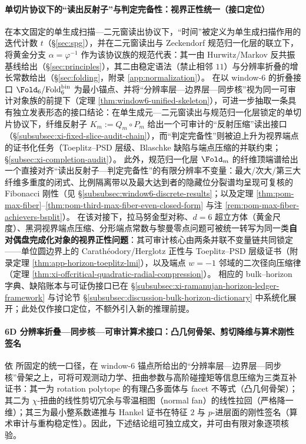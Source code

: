 \paragraph{单切片协议下的“读出反射子”与判定完备性：视界正性统一（接口定位）}
在本文固定的单生成扫描—二元窗读出协议下，“时间”被定义为单生成扫描作用的迭代计数 \(t\)（\S\ref{sec:spg}），并在二元窗读出与 Zeckendorf 规范归一化层的联立下，将黄金分支 \(\alpha=\varphi^{-1}\) 作为该协议族的规范代表：其一由 Hurwitz/Markov 反共振基线给出（\S\ref{sec:principles}），其二由稳定语法（禁止相邻 \(11\)）与分辨率折叠的增长常数给出（\S\ref{sec:folding}，附录 \ref{app:normalization}）。
在以 window-\(6\) 的折叠接口 \(\Fold_6/\mathrm{Fold}^{\mathrm{bin}}_6\) 为最小锚点、并将“分辨率层—边界层—同步核”视为同一可审计对象族的前提下（定理 \ref{thm:window6-unified-skeleton}），可进一步抽取一条具有独立发表形态的接口结论：在单生成元—二元窗读出与规范归一化层锁定的单切片协议下，纤维反射子 \(K_m:=Q_m\circ P_m\) 给出一个可审计的“反射压缩”读出接口（\S\ref{subsubsec:xi-fixed-slice-audit-chain}），而“判定完备性”则被迫上升为视界端点的证书化任务（Toeplitz--PSD 层级、Blaschke 缺陷与端点压缩的并联约束；\S\ref{subsec:xi-completion-audit}）。
此外，规范归一化层 \(\Fold_m\) 的纤维顶端谱给出一个直接对齐“读出反射子—判定完备性”的有限分辨率不变量：最大/次大/第三大纤维多重度的闭式、比例隔离带以及最大达到者的隐藏位分裂谱均呈现可复核的 Fibonacci 刚性（见 \S\ref{subsubsec:window6-discrete-results}；以及定理 \ref{thm:pom-max-fiber}--\ref{thm:pom-third-max-fiber-even-closed-form} 与注 \ref{rem:pom-max-fiber-achievers-bsplit}）。
在该对接下，拉马努金型对称、\(d=6\) 超立方体（黄金尺度）、黑洞视界端点压缩、分形端点常数与黎曼零点问题可被统一转写为同一类\textbf{自对偶盘完成化对象的视界正性问题}：其可审计核心由两条并联不变量链共同锁定——单位圆边界上的 Carath\'eodory/Herglotz 正性与 Toeplitz--PSD 层级证书（附录定理 \ref{thm:app-horizon-toeplitz-lmi}），以及端点 \(w=-1\) 邻域的二次径向压缩律（定理 \ref{thm:xi-offcritical-quadratic-radial-compression}）。
相应的 bulk--horizon 字典、缺陷账本与可证伪接口已在 \S\ref{subsubsec:xi-ramanujan-horizon-ledger-framework} 与讨论节 \S\ref{subsubsec:discussion-bulk-horizon-dictionary} 中系统化展开；此处仅作接口定位，不额外引入新的推理前提。

\paragraph{6D 分辨率折叠—同步核—可审计算术接口：凸几何骨架、剪切降维与算术刚性签名}
依 \cite{Internal2026POMGenerativeAddressThreeRegisterBridgeRH} 所固定的统一口径，在 window-\(6\) 锚点所给出的“分辨率层—边界层—同步核”骨架之上，可将可观测动力学、扭曲参数与高阶碰撞矩等信息压缩为三类互补证书：其一为 rotation polytope 的有理凸多面体与 facet 不等式（凸几何骨架）；其二为 \(\chi\)-扭曲的线性剪切冗余与零温相图（normal fan）的线性拉回（严格降一维）；其三为最小整系数递推与 Hankel 证书在特征 \(2\) 与 \(p\)-进层面的刚性签名（算术审计与重构稳定性）。因此，下述结论组可独立成文，并可由有限对象逐项核验。

